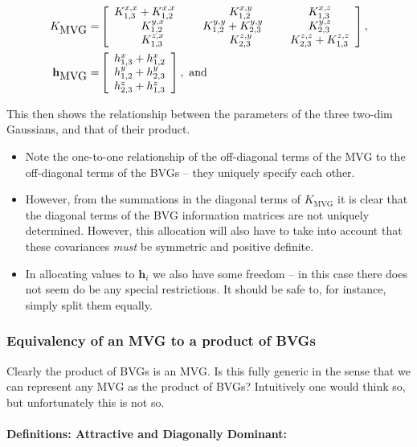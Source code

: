 \begin{align}
K_{\mbox{\mbox{MVG}}}= & \left[\begin{array}{ccc}
K_{1,3}^{x,x}+K_{1,2}^{x,x}\hspace{5mm} & K_{1,2}^{x,y} & K_{1,3}^{x,z}\\
K_{1,2}^{y,x} & K_{1,2}^{y,y}+K_{2,3}^{y,y}\hspace{5mm} & K_{2,3}^{y,z}\\
K_{1,3}^{z,x} & K_{2,3}^{z,y} & K_{2,3}^{z,z}+K_{1,3}^{z,z}
\end{array}\right],\\
\mathbf{h}_{\mbox{\mbox{MVG}}}= & \left[\begin{array}{c}
h_{1,3}^{x}+h_{1,2}^{x}\\
h_{1,2}^{y}+h_{2,3}^{y}\\
h_{2,3}^{z}+h_{1,3}^{z}
\end{array}\right],\mbox{ and }
\end{align}


This then shows the relationship between the parameters of the three
two-dim Gaussians, and that of their product.
\begin{itemize}
\item Note the one-to-one relationship of the off-diagonal terms of the
MVG to the off-diagonal terms of the BVGs -- they uniquely specify
each other.
\item However, from the summations in the diagonal terms of $K_{\mbox{MVG}}$
it is clear that the diagonal terms of the BVG information matrices
are not uniquely determined. However, this allocation will also have
to take into account that these covariances \emph{must }be symmetric
and positive definite.
\item In allocating values to $\mathbf{h}_{i}$ we also have some freedom
-- in this case there does not seem do be any special restrictions.
It should be safe to, for instance, simply split them equally.
\end{itemize}

\subsubsection{Equivalency of an MVG to a product of BVGs}

Clearly the product of BVGs is an MVG. Is this fully generic in the
sense that we can represent any MVG as the product of BVGs? Intuitively
one would think so, but unfortunately this is not so.


\paragraph{Definitions: Attractive and Diagonally Dominant:}

